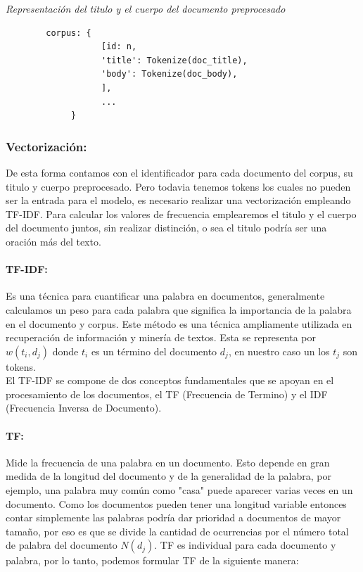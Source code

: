 \documentclass[runningheads,a4paper]{llncs}
\begin{document}
\noindent
{\it Representación del titulo y el cuerpo del documento preprocesado}
\begin{verbatim}
	    corpus: {
                   [id: n,
                   'title': Tokenize(doc_title),
                   'body': Tokenize(doc_body),
                   ],
                   ...
             }
\end{verbatim}
%
\noindent

\subsubsection{Vectorización:} De esta forma contamos con el identificador para cada documento del corpus, su titulo y cuerpo preprocesado. Pero todavia tenemos tokens los cuales no pueden ser la entrada para el modelo, es necesario realizar una vectorización
empleando TF-IDF. Para calcular los valores de frecuencia emplearemos el titulo y el cuerpo del documento juntos, sin realizar distinción, o sea el titulo podría ser una oración más del texto.

\paragraph*{TF-IDF:} Es una técnica para cuantificar una palabra en documentos, generalmente calculamos un peso para cada palabra que significa la importancia de la palabra en el documento y corpus. Este método es una técnica ampliamente utilizada en recuperación de información y minería de textos. Esta se representa por $w(t_i, d_j)$ donde $t_i$ es un término del documento $d_j$, en nuestro caso un los $t_j$ son tokens. \\

El TF-IDF se compone de dos conceptos fundamentales que se apoyan en el procesamiento de los documentos, el TF (Frecuencia de Termino) y el IDF (Frecuencia Inversa de Documento).

\paragraph*{TF:} Mide la frecuencia de una palabra en un documento. Esto depende en gran medida de la longitud del documento y de la generalidad de la palabra, por ejemplo, una palabra muy común como "casa" puede aparecer varias veces en un documento. Como los documentos pueden tener una longitud variable entonces contar simplemente las palabras podría dar prioridad a documentos de mayor tamaño, por eso es que se divide la cantidad de ocurrencias por el número total de palabra del documento $N(d_j)$. TF es individual para cada documento y palabra, por lo tanto, podemos formular TF de la siguiente manera:
\end{document}
